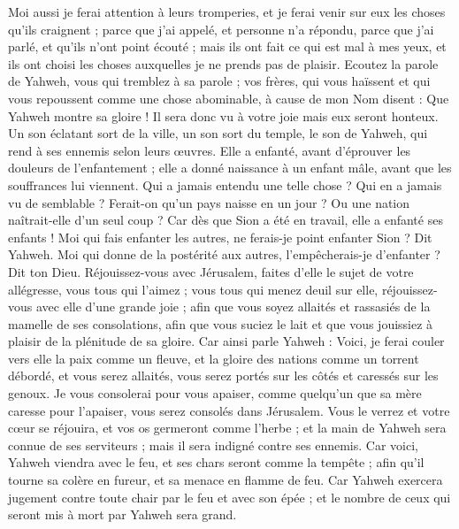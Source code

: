 \begin{multicols}{2}
Moi aussi je ferai attention à leurs tromperies, et je ferai venir sur eux les choses qu'ils craignent ; parce que j'ai appelé, et personne n'a répondu, parce que j'ai parlé, et qu'ils n'ont point écouté ; mais ils ont fait ce qui est mal à mes yeux, et ils ont choisi les choses auxquelles je ne prends pas de plaisir. 
Ecoutez la parole de Yahweh, vous qui tremblez à sa parole ; vos frères, qui vous haïssent et qui vous repoussent comme une chose abominable, à cause de mon Nom disent : Que Yahweh montre sa gloire ! Il sera donc vu à votre joie mais eux seront honteux. 
Un son éclatant sort de la ville, un son sort du temple, le son de Yahweh, qui rend à ses ennemis selon leurs œuvres.
Elle a enfanté, avant d'éprouver les douleurs de l'enfantement ; elle a donné naissance à un enfant mâle, avant que les souffrances lui viennent.
Qui a jamais entendu une telle chose ? Qui en a jamais vu de semblable ? Ferait-on qu'un pays naisse en un jour ? Ou une nation naîtrait-elle d'un seul coup ? Car dès que Sion a été en travail, elle a enfanté ses enfants !
Moi qui fais enfanter les autres, ne ferais-je point enfanter Sion ? Dit Yahweh. Moi qui donne de la postérité aux autres, l'empêcherais-je d'enfanter ? Dit ton Dieu.
Réjouissez-vous avec Jérusalem, faites d'elle le sujet de votre allégresse, vous tous qui l'aimez ; vous tous qui menez deuil sur elle, réjouissez-vous avec elle d'une grande joie ;
afin que vous soyez allaités et rassasiés de la mamelle de ses consolations, afin que vous suciez le lait et que vous jouissiez à plaisir de la plénitude de sa gloire.
Car ainsi parle Yahweh : Voici, je ferai couler vers elle la paix comme un fleuve, et la gloire des nations comme un torrent débordé, et vous serez allaités, vous serez portés sur les côtés et caressés sur les genoux.
Je vous consolerai pour vous apaiser, comme quelqu'un que sa mère caresse pour l'apaiser, vous serez consolés dans Jérusalem.
Vous le verrez et votre cœur se réjouira, et vos os germeront comme l'herbe ; et la main de Yahweh sera connue de ses serviteurs ; mais il sera indigné contre ses ennemis.
Car voici, Yahweh viendra avec le feu, et ses chars seront comme la tempête ; afin qu'il tourne sa colère en fureur, et sa menace en flamme de feu.
Car Yahweh exercera jugement contre toute chair par le feu et avec son épée ; et le nombre de ceux qui seront mis à mort par Yahweh sera grand.

\end{multicols}
